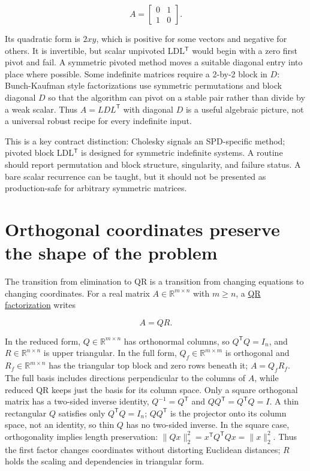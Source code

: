 \[
A=\begin{bmatrix}0&1\\1&0\end{bmatrix}.
\]

Its quadratic form is \(2xy\), which is positive for some vectors and negative for others. It is invertible, but scalar unpivoted LDL\(^\mathsf T\) would begin with a zero first pivot and fail. A symmetric pivoted method moves a suitable diagonal entry into place where possible. Some indefinite matrices require a 2-by-2 block in \(D\): Bunch-Kaufman style factorizations use symmetric permutations and block diagonal \(D\) so that the algorithm can pivot on a stable pair rather than divide by a weak scalar. Thus \(A=LDL^\mathsf T\) with diagonal \(D\) is a useful algebraic picture, not a universal robust recipe for every indefinite input.

This is a key contract distinction: Cholesky signals an SPD-specific method; pivoted block LDL\(^\mathsf T\) is designed for symmetric indefinite systems. A routine should report permutation and block structure, singularity, and failure status. A bare scalar recurrence can be taught, but it should not be presented as production-safe for arbitrary symmetric matrices.

\section{Orthogonal coordinates preserve the shape of the problem}\label{01-foundations-i-ch020-orthogonal-coordinates-preserve-the-shape-of-the-problem}

\hypertarget{01-foundations-i-ch020-orthogonal-coordinates-preserve-the-shape-of-the-problem}{}

The transition from elimination to QR is a transition from changing equations to changing coordinates. For a real matrix \(A\in\mathbb R^{m\times n}\) with \(m\ge n\), a \hyperref[01-foundations-i-ch020-reflections-and-plane-rotations-build-qr-without-losing-lengths]{QR factorization} writes

\[
A=QR.
\]

In the reduced form, \(Q\in\mathbb R^{m\times n}\) has orthonormal columns, so \(Q^\mathsf TQ=I_n\), and \(R\in\mathbb R^{n\times n}\) is upper triangular. In the full form, \(Q_f\in\mathbb R^{m\times m}\) is orthogonal and \(R_f\in\mathbb R^{m\times n}\) has the triangular top block and zero rows beneath it; \(A=Q_fR_f\). The full basis includes directions perpendicular to the columns of \(A\), while reduced QR keeps just the basis for its column space. Only a square orthogonal matrix has a two-sided inverse identity, \(Q^{-1}=Q^\mathsf T\) and \(QQ^\mathsf T=Q^\mathsf TQ=I\). A thin rectangular \(Q\) satisfies only \(Q^\mathsf TQ=I_n\); \(QQ^\mathsf T\) is the projector onto its column space, not an identity, so thin \(Q\) has no two-sided inverse. In the square case, orthogonality implies length preservation: \(\|Qx\|_2^2=x^\mathsf TQ^\mathsf TQx=\|x\|_2^2\). Thus the first factor changes coordinates without distorting Euclidean distances; \(R\) holds the scaling and dependencies in triangular form.

